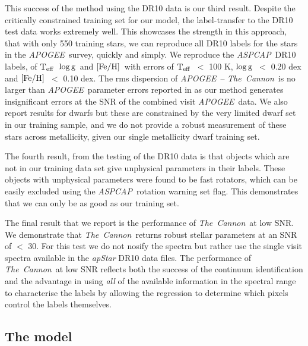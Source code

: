 \documentclass[12pt, preprint]{aastex}
\newcommand{\teff}{\mbox{$\rm T_{eff}$}}
\newcommand{\feh}{\mbox{$\rm [Fe/H]$}}
\newcommand{\logg}{\mbox{$\rm \log g$}}
\newcommand{\tc}{\textsl{The~Cannon}}
\newcommand{\apogee}{\textsl{APOGEE}}
\newcommand{\aspcap}{\textsl{ASPCAP}}
\begin{document}
This success of the method using the DR10 data is our third result.  Despite the critically constrained training set for our model, the label-transfer to the DR10 test data works extremely well. This showcases the strength in this approach, that with only 550 training stars, we can reproduce all DR10 labels for the stars in the \apogee\ survey, quickly and simply.  
We reproduce the \aspcap\ DR10 labels, of \teff\, \logg\ and \feh\ with errors of \teff\ $<$ 100 K, \logg\ $<$ 0.20 dex and \feh\ $<$ 0.10 dex. The rms dispersion of \apogee\ -- \tc\ is no larger than \apogee\ parameter errors reported in \citep{Meszaros2013} as our method generates insignificant errors at the SNR of the combined visit \apogee\ data. We also report results for dwarfs but these are constrained by the very limited dwarf set in our training sample, and we do not provide a robust measurement of these stars across metallicity, given our single metallicity dwarf training set.

The fourth result, from the testing of the DR10 data is that objects which are not in our training data set give unphysical parameters in their labels. These objects with unphysical parameters were found to be fast rotators, which can be easily excluded using the \aspcap\ rotation warning set flag. This demonstrates that we can only be as good as our training set. 

The final result that we report is the performance of \tc\ at low SNR. We demonstrate that \tc\ returns robust stellar parameters at an SNR of $<$ 30. For this test we do not nosify the spectra but rather use the single visit spectra available in the \textit{apStar} DR10 data files. The performance of \tc\ at low SNR reflects both the success of the continuum identification and the advantage in using \textit{all} of the available information in the spectral range to characterise the labels by allowing the regression to determine which pixels control the labels themselves.


\subsection{The model} 
\end{document}
